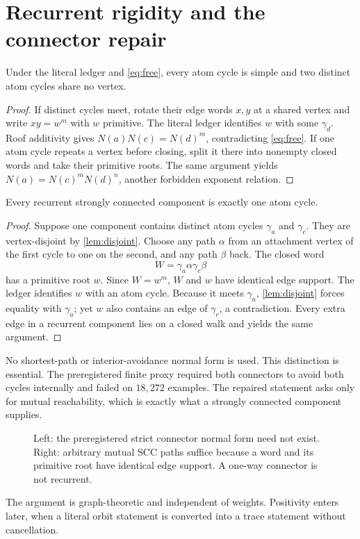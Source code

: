 \section{Recurrent rigidity and the connector repair}

\begin{lemma}\label{lem:disjoint}
Under the literal ledger and \eqref{eq:free}, every atom cycle is simple and
two distinct atom cycles share no vertex.
\end{lemma}

\begin{proof}
If distinct cycles meet, rotate their edge words $x,y$ at a shared vertex and
write $xy=w^m$ with $w$ primitive.  The literal ledger identifies $w$ with
some $\gamma_d$.  Roof additivity gives
$N(a)N(c)=N(d)^m$, contradicting \eqref{eq:free}.  If one atom cycle repeats
a vertex before closing, split it there into nonempty closed words and take
their primitive roots.  The same argument yields
$N(a)=N(c)^mN(d)^n$, another forbidden exponent relation.
\end{proof}

\begin{lemma}\label{lem:scc}
Every recurrent strongly connected component is exactly one atom cycle.
\end{lemma}

\begin{proof}
Suppose one component contains distinct atom cycles $\gamma_a$ and
$\gamma_c$.  They are vertex-disjoint by \cref{lem:disjoint}.  Choose any
path $\alpha$ from an attachment vertex of the first cycle to one on the
second, and any path $\beta$ back.  The closed word
\[
W=\gamma_a\alpha\gamma_c\beta
\]
has a primitive root $w$.  Since $W=w^m$, $W$ and $w$ have identical edge
support.  The ledger identifies $w$ with an atom cycle.  Because it meets
$\gamma_a$, \cref{lem:disjoint} forces equality with $\gamma_a$; yet $w$
also contains an edge of $\gamma_c$, a contradiction.  Every extra edge in
a recurrent component lies on a closed walk and yields the same argument.
\end{proof}

No shortest-path or interior-avoidance normal form is used.  This distinction
is essential.  The preregistered finite proxy required both connectors to
avoid both cycles internally and failed on $18{,}272$ examples.  The repaired
statement asks only for mutual reachability, which is exactly what a strongly
connected component supplies.

\begin{figure}[t]
\centering

\caption{Left: the preregistered strict connector normal form need not exist.
Right: arbitrary mutual SCC paths suffice because a word and its primitive
root have identical edge support.  A one-way connector is not recurrent.}
\label{fig:repair}
\end{figure}

The argument is graph-theoretic and independent of weights.  Positivity
enters later, when a literal orbit statement is converted into a trace
statement without cancellation.
